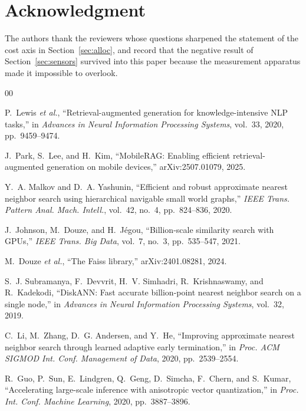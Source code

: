 \documentclass[journal]{IEEEtran}
\begin{document}
\section*{Acknowledgment}

The authors thank the reviewers whose questions sharpened the statement of
the cost axis in Section~\ref{sec:alloc}, and record that the negative
result of Section~\ref{sec:sensors} survived into this paper because the
measurement apparatus made it impossible to overlook.

\begin{thebibliography}{00}

P.~Lewis \emph{et al.}, ``Retrieval-augmented generation for
knowledge-intensive NLP tasks,'' in \emph{Advances in Neural Information
Processing Systems}, vol.~33, 2020, pp.~9459--9474.

J.~Park, S.~Lee, and H.~Kim, ``MobileRAG: Enabling efficient
retrieval-augmented generation on mobile devices,'' arXiv:2507.01079, 2025.

Y.~A. Malkov and D.~A. Yashunin, ``Efficient and robust approximate nearest
neighbor search using hierarchical navigable small world graphs,'' \emph{IEEE
Trans. Pattern Anal. Mach. Intell.}, vol.~42, no.~4, pp.~824--836, 2020.

J.~Johnson, M.~Douze, and H.~J\'egou, ``Billion-scale similarity search with
GPUs,'' \emph{IEEE Trans. Big Data}, vol.~7, no.~3, pp.~535--547, 2021.

M.~Douze \emph{et al.}, ``The Faiss library,'' arXiv:2401.08281, 2024.

S.~J. Subramanya, F.~Devvrit, H.~V. Simhadri, R.~Krishnaswamy, and
R.~Kadekodi, ``DiskANN: Fast accurate billion-point nearest neighbor search on
a single node,'' in \emph{Advances in Neural Information Processing Systems},
vol.~32, 2019.

C.~Li, M.~Zhang, D.~G. Andersen, and Y.~He, ``Improving approximate nearest
neighbor search through learned adaptive early termination,'' in \emph{Proc.
ACM SIGMOD Int. Conf. Management of Data}, 2020, pp.~2539--2554.

R.~Guo, P.~Sun, E.~Lindgren, Q.~Geng, D.~Simcha, F.~Chern, and S.~Kumar,
``Accelerating large-scale inference with anisotropic vector quantization,''
in \emph{Proc. Int. Conf. Machine Learning}, 2020, pp.~3887--3896.


\end{thebibliography}
\end{document}
